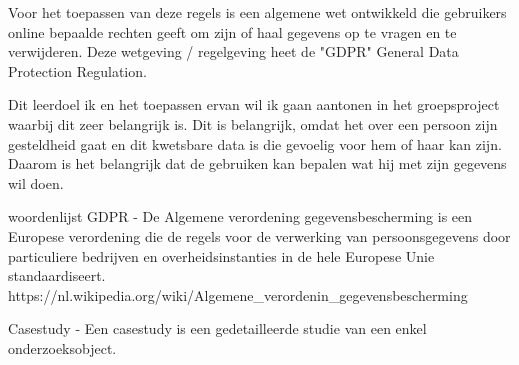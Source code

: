 Voor het toepassen van deze regels is een algemene wet ontwikkeld die gebruikers online bepaalde rechten geeft om zijn of haal gegevens op te vragen en te verwijderen.
Deze wetgeving / regelgeving heet de "GDPR" General Data Protection Regulation.

Dit leerdoel ik en het toepassen ervan wil ik gaan aantonen in het groepsproject waarbij dit zeer belangrijk is.
Dit is belangrijk, omdat het over een persoon zijn gesteldheid gaat en dit kwetsbare data is die gevoelig voor hem of haar kan zijn.
Daarom is het belangrijk dat de gebruiken kan bepalen wat hij met zijn gegevens wil doen.


\newpage
\bigskip
\bigskip
woordenlijst
GDPR - De Algemene verordening gegevensbescherming is een Europese verordening die de regels voor de verwerking van
persoonsgegevens door particuliere bedrijven en overheidsinstanties in de hele Europese Unie standaardiseert.
https://nl.wikipedia.org/wiki/Algemene\_verordenin\_gegevensbescherming

Casestudy -  Een casestudy is een gedetailleerde studie van een enkel onderzoeksobject.

